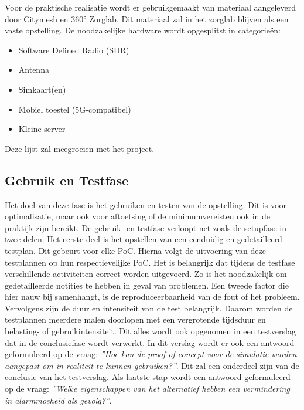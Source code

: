 Voor de praktische realisatie wordt er gebruikgemaakt van materiaal aangeleverd door Citymesh en 360° Zorglab. Dit materiaal zal in het zorglab blijven als een vaste opstelling. De noodzakelijke hardware wordt opgesplitst in categorieën:

\begin{itemize}
  \item Software Defined Radio (SDR)
  \item Antenna
  \item Simkaart(en)
  \item Mobiel toestel (5G-compatibel)
  \item Kleine server
\end{itemize}

Deze lijst zal meegroeien met het project.

\subsection{Gebruik en Testfase}
Het doel van deze fase is het gebruiken en testen van de opstelling. Dit is voor optimalisatie, maar ook voor aftoetsing of de minimumvereisten ook in de praktijk zijn bereikt. De gebruik- en testfase verloopt net zoals de setupfase in twee delen. Het eerste deel is het opstellen van een eenduidig en gedetailleerd testplan. Dit gebeurt voor elke PoC. Hierna volgt de uitvoering van deze testplannen op hun respectievelijke PoC. Het is belangrijk dat tijdens de testfase verschillende activiteiten correct worden uitgevoerd. Zo is het noodzakelijk om gedetailleerde notities te hebben in geval van problemen. Een tweede factor die hier nauw bij samenhangt, is de reproduceerbaarheid van de fout of het probleem. Vervolgens zijn de duur en intensiteit van de test belangrijk. Daarom worden de testplannen meerdere malen doorlopen met een vergrotende tijdsduur en belasting- of gebruikintensiteit. Dit alles wordt ook opgenomen in een testverslag dat in de conclusiefase wordt verwerkt. In dit verslag wordt er ook een antwoord geformuleerd op de vraag: \textit{''Hoe kan de proof of concept voor de simulatie worden aangepast om in realiteit te kunnen gebruiken?''}. Dit zal een onderdeel zijn van de conclusie van het testverslag. Als laatste stap wordt een antwoord geformuleerd op de vraag: \textit{''Welke eigenschappen van het alternatief hebben een vermindering in alarmmoeheid als gevolg?''}.

